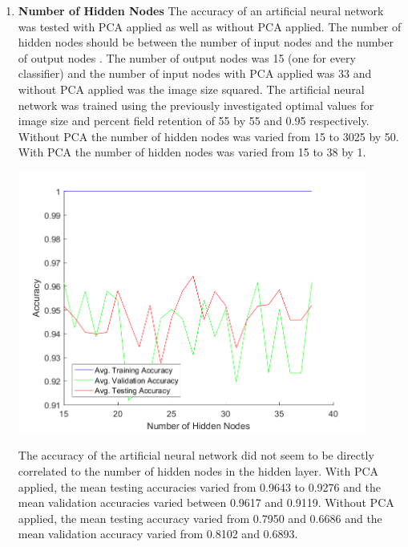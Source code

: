 \documentclass[12pt]{article}
\begin{document}
\begin{enumerate}
  \item \textbf{Number of Hidden Nodes}
  The accuracy of an artificial neural network was tested with PCA applied as well as without PCA applied. The number of hidden nodes should be between the number of input nodes and the number of output nodes \cite{introNN}. The number of output nodes was 15 (one for every classifier) and the number of input nodes with PCA applied was 33 and without PCA applied was the image size squared. The artificial neural network was trained using the previously investigated optimal values for image size and percent field retention of 55 by 55 and 0.95 respectively.\\

  Without PCA the number of hidden nodes was varied from 15 to 3025 by 50. With PCA the number of hidden nodes was varied from 15 to 38 by 1.\\
  \begin{center}
    \includegraphics[width=115mm]{./figs/num_hidden_nodes_empirical.png}
    \label{fig:num_hidden_nodes}
  \end{center}
  The accuracy of the artificial neural network did not seem to be directly correlated to the number of hidden nodes in the hidden layer. With PCA applied, the mean testing accuracies varied from 0.9643 to 0.9276 and the mean validation accuracies varied between 0.9617 and 0.9119. Without PCA applied, the mean testing accuracy varied from 0.7950 and 0.6686 and the mean validation accuracy varied from 0.8102 and 0.6893.\\
\end{enumerate}
\end{document}
